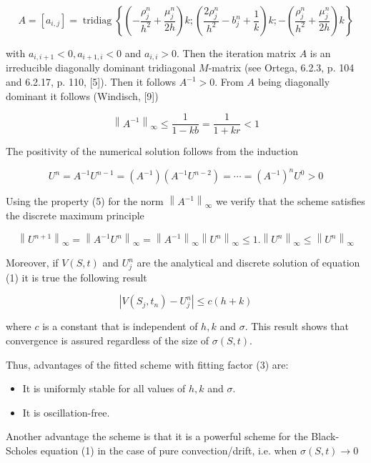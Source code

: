 \documentclass[10pt]{article}
\begin{document}
$$
A=\left[a_{i, j}\right]=\operatorname{tridiag}\left\{\left(-\frac{\rho_{j}^{n}}{h^{2}}+\frac{\mu_{j}^{n}}{2 h}\right) k ;\left(\frac{2 \rho_{j}^{n}}{h^{2}}-b_{j}^{n}+\frac{1}{k}\right) k ;-\left(\frac{\rho_{j}^{n}}{h^{2}}+\frac{\mu_{j}^{n}}{2 h}\right) k\right\}
$$

with $a_{i, i+1}<0, a_{i+1, i}<0$ and $a_{i, i}>0$. Then the iteration matrix $A$ is an irreducible diagonally dominant tridiagonal $M$-matrix (see Ortega, 6.2.3, p. 104 and 6.2.17, p. 110, [5]). Then it follows $A^{-1}>0$. From $A$ being diagonally dominant it follows (Windisch, [9])


\begin{equation*}
\left\|A^{-1}\right\|_{\infty} \leq \frac{1}{1-k b}=\frac{1}{1+k r}<1 \tag{5}
\end{equation*}


The positivity of the numerical solution follows from the induction

$$
U^{n}=A^{-1} U^{n-1}=\left(A^{-1}\right)\left(A^{-1} U^{n-2}\right)=\cdots=\left(A^{-1}\right)^{n} U^{0}>0
$$

Using the property (5) for the norm $\left\|A^{-1}\right\|_{\infty}$ we verify that the scheme satisfies the discrete maximum principle

$$
\left\|U^{n+1}\right\|_{\infty}=\left\|A^{-1} U^{n}\right\|_{\infty}=\left\|A^{-1}\right\|_{\infty}\left\|U^{n}\right\|_{\infty} \leq 1 .\left\|U^{n}\right\|_{\infty} \leq\left\|U^{n}\right\|_{\infty}
$$

Moreover, if $V(S, t)$ and $U_{j}^{n}$ are the analytical and discrete solution of equation (1) it is true the following result


\begin{equation*}
\left|V\left(S_{j}, t_{n}\right)-U_{j}^{n}\right| \leq c(h+k) \tag{6}
\end{equation*}


where $c$ is a constant that is independent of $h, k$ and $\sigma$. This result shows that convergence is assured regardless of the size of $\sigma(S, t)$.

Thus, advantages of the fitted scheme with fitting factor (3) are:

\begin{itemize}
  \item It is uniformly stable for all values of $h, k$ and $\sigma$.
  \item It is oscillation-free.
\end{itemize}

Another advantage the scheme is that it is a powerful scheme for the Black-Scholes equation (1) in the case of pure convection/drift, i.e. when $\sigma(S, t) \rightarrow 0$
\end{document}
